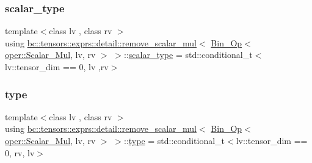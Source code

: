 \subsubsection{\texorpdfstring{scalar\+\_\+type}{scalar\_type}}
{\footnotesize\ttfamily template$<$class lv , class rv $>$ \\
using \hyperlink{structbc_1_1tensors_1_1exprs_1_1detail_1_1remove__scalar__mul}{bc\+::tensors\+::exprs\+::detail\+::remove\+\_\+scalar\+\_\+mul}$<$ \hyperlink{structbc_1_1tensors_1_1exprs_1_1Bin__Op}{Bin\+\_\+\+Op}$<$ \hyperlink{structbc_1_1oper_1_1Scalar__Mul}{oper\+::\+Scalar\+\_\+\+Mul}, lv, rv $>$ $>$\+::\hyperlink{structbc_1_1tensors_1_1exprs_1_1detail_1_1remove__scalar__mul_3_01Bin__Op_3_01oper_1_1Scalar__Mul_00_01lv_00_01rv_01_4_01_4_a0bad779738ad8a0a4bd854a6f68dff7c}{scalar\+\_\+type} =  std\+::conditional\+\_\+t$<$lv\+::tensor\+\_\+dim == 0, lv ,rv$>$}

\mbox{\label{structbc_1_1tensors_1_1exprs_1_1detail_1_1remove__scalar__mul_3_01Bin__Op_3_01oper_1_1Scalar__Mul_00_01lv_00_01rv_01_4_01_4_ae82759eac7760c962640683384337bc1}} 
\subsubsection{\texorpdfstring{type}{type}}
{\footnotesize\ttfamily template$<$class lv , class rv $>$ \\
using \hyperlink{structbc_1_1tensors_1_1exprs_1_1detail_1_1remove__scalar__mul}{bc\+::tensors\+::exprs\+::detail\+::remove\+\_\+scalar\+\_\+mul}$<$ \hyperlink{structbc_1_1tensors_1_1exprs_1_1Bin__Op}{Bin\+\_\+\+Op}$<$ \hyperlink{structbc_1_1oper_1_1Scalar__Mul}{oper\+::\+Scalar\+\_\+\+Mul}, lv, rv $>$ $>$\+::\hyperlink{structbc_1_1tensors_1_1exprs_1_1detail_1_1remove__scalar__mul_3_01Bin__Op_3_01oper_1_1Scalar__Mul_00_01lv_00_01rv_01_4_01_4_ae82759eac7760c962640683384337bc1}{type} =  std\+::conditional\+\_\+t$<$lv\+::tensor\+\_\+dim == 0, rv, lv$>$}



